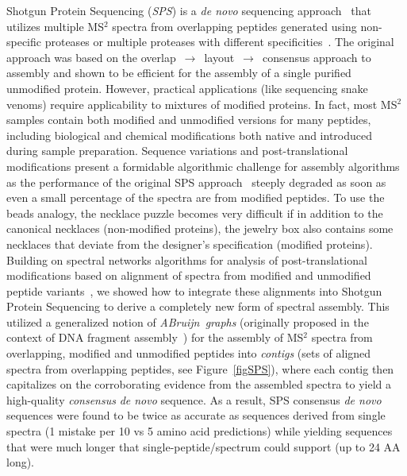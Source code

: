 \documentclass[8.5pt,twoside,twocolumn]{article}
\begin{document}
Shotgun Protein Sequencing ({\em SPS}) is a {\em de novo} sequencing approach~\cite{bandeira04} that utilizes multiple MS$^2$ spectra from overlapping peptides generated using non-specific proteases or multiple proteases with different specificities~\cite{johnson87,klammer06,englander03,maccoss02a,pham06}. The original approach was based on the overlap~$\rightarrow$~layout~$\rightarrow$~consensus approach to assembly and shown to be efficient for the assembly of a single purified unmodified protein. However, practical applications (like sequencing snake venoms) require applicability to mixtures of modified proteins. In fact, most MS$^2$ samples contain both modified and unmodified versions for many peptides, including biological and chemical modifications both native and introduced during sample preparation. Sequence variations and post-translational modifications present a formidable algorithmic challenge for assembly algorithms as the performance of the original SPS approach~\cite{bandeira04} steeply degraded as soon as even a small percentage of the spectra are from modified peptides. To use the beads analogy, the necklace puzzle becomes very difficult if in addition to the canonical necklaces (non-modified proteins), the jewelry box also contains some necklaces that deviate from the designer's specification (modified proteins). Building on spectral networks algorithms for analysis of post-translational modifications based on alignment of spectra from modified and unmodified peptide variants~\cite{bandeira06,bandeira07pnas}, we showed how to integrate these alignments into Shotgun Protein Sequencing to derive a completely new form of spectral assembly. This utilized a generalized notion of {\em ABruijn~graphs} (originally proposed in the context of DNA fragment assembly~\cite{pevzner04}) for the assembly of MS$^2$ spectra from overlapping, modified and unmodified peptides into {\em contigs} (sets of aligned spectra from overlapping peptides, see Figure~\ref{figSPS}), where each contig then capitalizes on the corroborating evidence from the assembled spectra to yield a high-quality {\em consensus} {\em de novo} sequence. As a result, SPS consensus {\em de novo} sequences were found to be twice as accurate as sequences derived from single spectra (1 mistake per 10 vs 5 amino acid predictions) while yielding sequences that were much longer that single-peptide/spectrum could support (up to 24 AA long).
\end{document}
